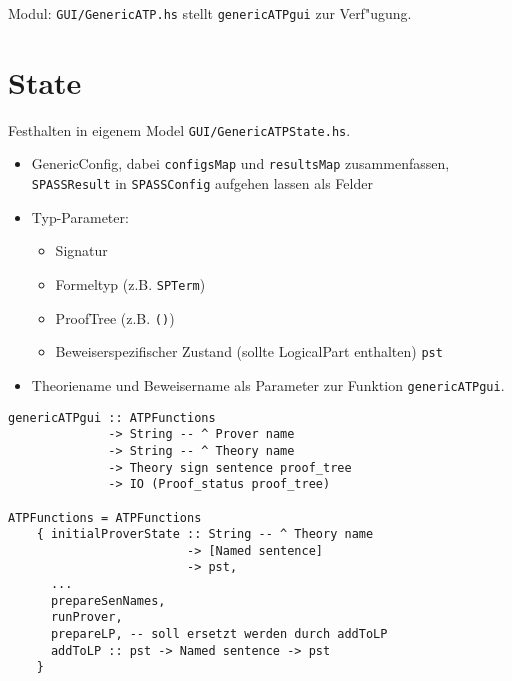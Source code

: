 \documentclass[11pt,a4paper,twoside]{article}
\begin{document}
Modul: \texttt{GUI/GenericATP.hs} stellt \texttt{genericATPgui} zur Verf"ugung.

\section*{State}
Festhalten in eigenem Model \texttt{GUI/GenericATPState.hs}.

\begin{itemize}
\item GenericConfig, dabei \texttt{configsMap} und \texttt{resultsMap} zusammenfassen, \texttt{SPASSResult} in \texttt{SPASSConfig} aufgehen lassen als Felder
\item Typ-Parameter:
    \begin{itemize}
    \item Signatur
    \item Formeltyp (z.B. \texttt{SPTerm})
    \item ProofTree (z.B. \texttt{()})
    \item Beweiserspezifischer Zustand (sollte LogicalPart enthalten) \texttt{pst}
    \end{itemize}
\item Theoriename und Beweisername als Parameter zur Funktion \texttt{genericATPgui}.
\end{itemize}


\begin{verbatim}
genericATPgui :: ATPFunctions
              -> String -- ^ Prover name
              -> String -- ^ Theory name
              -> Theory sign sentence proof_tree
              -> IO (Proof_status proof_tree)

ATPFunctions = ATPFunctions
    { initialProverState :: String -- ^ Theory name
                         -> [Named sentence]
                         -> pst,
      ...
      prepareSenNames,
      runProver,
      prepareLP, -- soll ersetzt werden durch addToLP
      addToLP :: pst -> Named sentence -> pst
    }
\end{verbatim}
\end{document}
